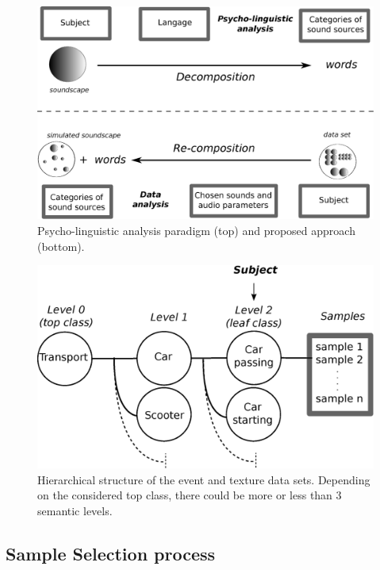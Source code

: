 \documentclass[twoside,twocolumn]{article}
\begin{document}
\begin{figure}[t]
\begin{center}
\includegraphics[width=.4\paperwidth]{../gfx/1.eps}
  \caption{\label{psycholing} Psycho-linguistic analysis paradigm (top) and proposed approach (bottom).}
  \end{center}
\end{figure}

\begin{figure}[t!]
\begin{center}
\includegraphics[width=.4\paperwidth]{../gfx/3.eps}
\caption{\label{datasetexample} Hierarchical structure of the event and texture data sets. Depending on the considered top class, there could be more or less than 3 semantic levels.}
\end{center}
\end{figure}

\subsection{Sample Selection process}
\end{document}
